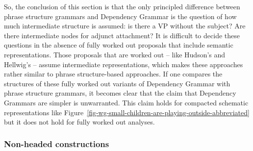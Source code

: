 So, the conclusion of this section is that the only principled difference between phrase structure grammars and
Dependency Grammar is the question of how much intermediate structure is assumed: is there a VP
without the subject? Are there intermediate nodes for adjunct attachment? It is difficult to decide
these questions in the absence of fully worked out proposals that include semantic
representations. Those proposals that are worked out -- like Hudson's and Hellwig's -- assume
intermediate representations, which makes these approaches rather similar to phrase structure-based
approaches. If one compares the structures of these fully worked out variants of Dependency Grammar
with phrase structure grammars, it becomes clear that the claim that Dependency Grammars are simpler
is unwarranted. This claim holds for compacted schematic representations like
Figure~\ref{fig-wg-small-children-are-playing-outside-abbreviated} but it does not hold for fully
worked out analyses.


\subsubsection{Non-headed constructions}
\label{sec-headless-constructions-dg}


